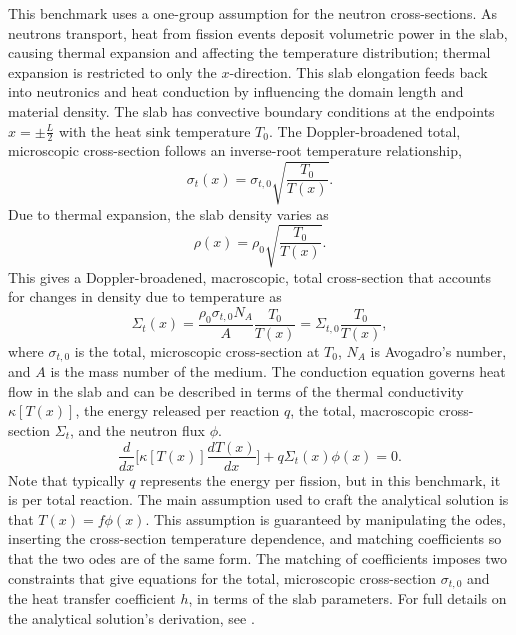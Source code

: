 \documentclass[letterpaper]{mc2023}
\begin{document}
This benchmark uses a one-group assumption for the neutron cross-sections. As neutrons transport, heat from fission events deposit
volumetric power in the slab, causing thermal expansion and affecting the temperature distribution; thermal expansion is restricted
to only the $x$-direction. This slab elongation feeds back into neutronics and heat conduction by influencing the domain length and
material density. The slab has convective boundary conditions at the endpoints $x=\pm \frac{L}{2}$ with the heat sink temperature
$T_{0}$. The Doppler-broadened total, microscopic cross-section follows an inverse-root temperature relationship,
\begin{equation}
    \sigma_{t}(x) = \sigma_{t,0}\sqrt{\frac{T_{0}}{T(x)}}.
\end{equation}
Due to thermal expansion, the slab density varies as
\begin{equation} \label{sec:intro:density}
    \rho(x) =  \rho_{0} \sqrt{\frac{T_{0}}{T(x)}}.
\end{equation}
This gives a Doppler-broadened, macroscopic, total cross-section that accounts for changes in density due to temperature as
\begin{equation} \label{sec:intro:doppler}
    \Sigma_{t}(x) = \frac{\rho_{0}\sigma_{t,0} N_{A}}{A} \frac{T_{0}}{T(x)} = \Sigma_{t,0}\frac{T_{0}}{T(x)} ,
\end{equation}
where $ \sigma_{t,0}$ is the total, microscopic cross-section at $T_{0}$, $N_{A}$ is Avogadro's number, and $A$ is the mass number
of the medium. The conduction equation governs heat flow in the slab and can be described in terms of the thermal conductivity
$\kappa[T(x)]$, the energy released per reaction $q$, the total, macroscopic cross-section $\Sigma_{t}$, and the neutron flux $\phi$.
\begin{equation}
     \frac{d}{dx}\bigg[\kappa[T(x)]\frac{dT(x)}{dx}\bigg] + q \Sigma_{t}(x)\phi(x) = 0.
\end{equation}
Note that typically $q$ represents the energy per fission, but in this benchmark, it is per total reaction. The main assumption
used to craft the analytical solution is that $T(x)=f\phi(x)$. This assumption is guaranteed by manipulating the \glspl{ode},
inserting the cross-section temperature dependence, and matching coefficients so that the two \glspl{ode} are of the same form.
The matching of coefficients imposes two constraints that give equations for the total, microscopic cross-section $\sigma_{t,0}$
and the heat transfer coefficient $h$, in terms of the slab parameters. For full details on the analytical solution's derivation,
see \cite{analytical-benchmark}.
\end{document}
